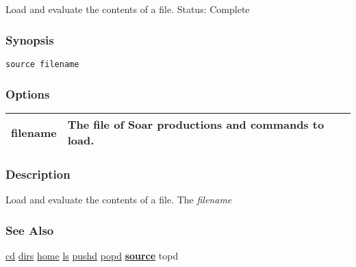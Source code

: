 \subsection{}
\label{source}
Load and evaluate the contents of a file. 
 Status: Complete
\subsubsection*{Synopsis}
\begin{verbatim}
source filename
\end{verbatim}
\subsubsection*{Options}
\begin{tabular}{|l|l|}
\hline 
filename & The file of Soar productions and commands to load.  \\
 \hline 
\end{tabular}
\subsubsection*{Description}
 Load and evaluate the contents of a file. The \emph{filename}
\subsubsection*{See Also}
\hyperref[cd]{cd} \hyperref[dirs]{dirs} \hyperref[home]{home} \hyperref[ls]{ls} \hyperref[pushd]{pushd} \hyperref[popd]{popd} \hyperref[\textbf{source}]{\textbf{source}}  topd

